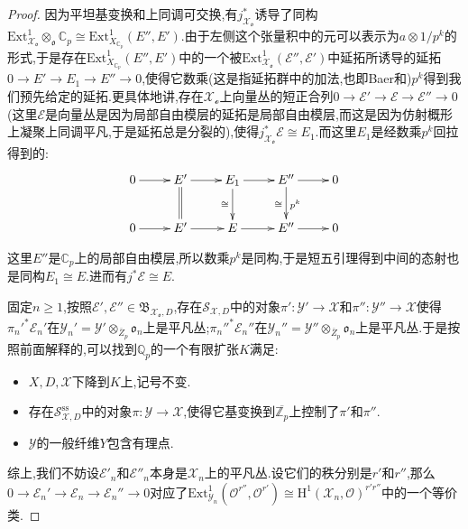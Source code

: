 \begin{enumerate}
\begin{proof}
    	因为平坦基变换和上同调可交换,有$j^*_{\mathcal{X}_{\mathfrak{o}}}$诱导了同构$\mathrm{Ext}^1_{\mathcal{X}_{\mathfrak{o}}}\otimes_{\mathfrak{o}}\mathbb{C}_p\cong\mathrm{Ext}^1_{X_{\mathbb{C}_p}}(E'',E')$.由于左侧这个张量积中的元可以表示为$a\otimes1/p^k$的形式,于是存在$\mathrm{Ext}^1_{X_{\mathbb{C}_p}}(E'',E')$中的一个被$\mathrm{Ext}_{\mathcal{X}_{\mathfrak{o}}}^1(\mathcal{E}'',\mathcal{E}')$中延拓所诱导的延拓$0\to E'\to E_1\to E''\to0$,使得它数乘(这是指延拓群中的加法,也即Baer和)$p^k$得到我们预先给定的延拓.更具体地讲,存在$\mathcal{X}_{\mathscr{o}}$上向量丛的短正合列$0\to\mathcal{E}'\to\mathcal{E}\to\mathcal{E}''\to0$(这里$\mathcal{E}$是向量丛是因为局部自由模层的延拓是局部自由模层,而这是因为仿射概形上凝聚上同调平凡,于是延拓总是分裂的),使得$j^*_{\mathcal{X}_{\mathfrak{o}}}\mathcal{E}\cong E_1$.而这里$E_1$是经数乘$p^k$回拉得到的:
    	$$\xymatrix{0\ar[r]&E'\ar[r]\ar@{=}[d]&E_1\ar[r]\ar[d]_{\cong}&E''\ar[r]\ar[d]_{\cong}^{p^k}&0\\0\ar[r]&E'\ar[r]&E\ar[r]&E''\ar[r]&0}$$
    	
    	这里$E''$是$\mathbb{C}_p$上的局部自由模层,所以数乘$p^k$是同构,于是短五引理得到中间的态射也是同构$E_1\cong E$.进而有$j^*\mathcal{E}\cong E$.
    	
    	\qquad
    	
    	固定$n\ge1$,按照$\mathcal{E}',\mathcal{E}''\in\mathfrak{B}_{\mathcal{X}_{\mathfrak{o}},D}$,存在$\mathcal{S}_{\mathcal{X},D}$中的对象$\pi':\mathcal{Y}'\to\mathcal{X}$和$\pi'':\mathcal{Y}''\to\mathcal{X}$使得${\pi_n'}^*\mathcal{E}_n'$在$\mathcal{Y}_n'=\mathcal{Y}'\otimes_{\overline{Z}_p}\mathfrak{o}_n$上是平凡丛;${\pi_n''}^*\mathcal{E}_n''$在$\mathcal{Y}_n''=\mathcal{Y}''\otimes_{\overline{Z}_p}\mathfrak{o}_n$上是平凡丛.于是按照前面解释的,可以找到$\mathbb{Q}_p$的一个有限扩张$K$满足:
    	\begin{itemize}
    		\item $X,D,\mathcal{X}$下降到$K$上,记号不变.
    		\item 存在$\mathcal{S}^{\mathrm{ss}}_{\mathcal{X},D}$中的对象$\pi:\mathcal{Y}\to\mathcal{X}$,使得它基变换到$\overline{\mathbb{Z}_p}$上控制了$\pi'$和$\pi''$.
    		\item $\mathcal{Y}$的一般纤维$Y$包含有理点.
    	\end{itemize}
    
        综上,我们不妨设$\mathcal{E}'_n$和$\mathcal{E}''_n$本身是$\mathcal{X}_n$上的平凡丛.设它们的秩分别是$r'$和$r''$,那么$0\to\mathcal{E}_n'\to\mathcal{E}_n\to\mathcal{E}_n''\to0$对应了$\mathrm{Ext}^1_{\mathcal{Y}_n}(\mathscr{O}^{r''},\mathscr{O}^{r'})\cong\mathrm{H}^1(\mathcal{X}_n,\mathscr{O})^{r'r''}$中的一个等价类.
        

\end{proof}
\end{enumerate}
